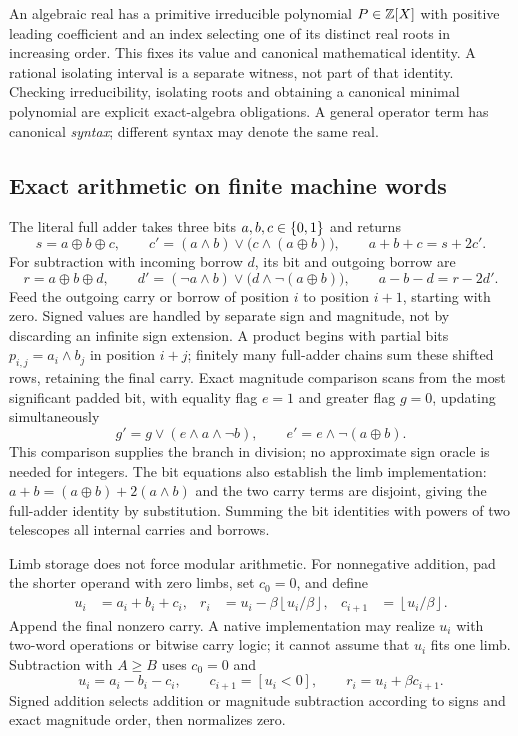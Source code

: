 An algebraic real has a primitive irreducible polynomial $P\in\mathbb Z[X]$ with
positive leading coefficient and an index selecting one of its distinct real
roots in increasing order. This fixes its value and canonical mathematical
identity. A rational isolating interval is a separate witness, not part of that
identity. Checking irreducibility, isolating roots and obtaining a canonical
minimal polynomial are explicit exact-algebra obligations. A general operator
term has canonical \emph{syntax}; different syntax may denote the same real.

\subsection{Exact arithmetic on finite machine words}
The literal full adder takes three bits $a,b,c\in\{0,1\}$ and returns
\[
 s=a\oplus b\oplus c,\qquad
 c'= (a\land b)\lor\bigl(c\land(a\oplus b)\bigr),
 \qquad a+b+c=s+2c'.
\]
For subtraction with incoming borrow $d$, its bit and outgoing borrow are
\[
 r=a\oplus b\oplus d,\qquad
 d'=(\neg a\land b)\lor\bigl(d\land\neg(a\oplus b)\bigr),
 \qquad a-b-d=r-2d'.
\]
Feed the outgoing carry or borrow of position $i$ to position $i+1$, starting
with zero. Signed values are handled by separate sign and magnitude, not by
discarding an infinite sign extension. A product begins with partial bits
$p_{i,j}=a_i\land b_j$ in position $i+j$; finitely many full-adder chains sum
these shifted rows, retaining the final carry. Exact magnitude comparison scans
from the most significant padded bit, with equality flag $e=1$ and greater flag
$g=0$, updating simultaneously
\[
 g'=g\lor(e\land a\land\neg b),\qquad
 e'=e\land\neg(a\oplus b).
\]
This comparison supplies the branch in division; no approximate sign oracle is
needed for integers. The bit equations also establish the limb implementation:
$a+b=(a\oplus b)+2(a\land b)$ and the two carry terms are disjoint, giving
the full-adder identity by substitution. Summing the bit identities with powers
of two telescopes all internal carries and borrows.

Limb storage does not force modular arithmetic. For nonnegative addition, pad
the shorter operand with zero limbs, set $c_0=0$, and define
\begin{align*}
 u_i&=a_i+b_i+c_i,&
 r_i&=u_i-\beta\left\lfloor u_i/\beta\right\rfloor,&
 c_{i+1}&=\left\lfloor u_i/\beta\right\rfloor.
\end{align*}
Append the final nonzero carry. A native implementation may realize $u_i$ with
two-word operations or bitwise carry logic; it cannot assume that $u_i$ fits one
limb. Subtraction with $A\ge B$ uses $c_0=0$ and
\[
 u_i=a_i-b_i-c_i,\qquad
 c_{i+1}=[u_i<0],\qquad r_i=u_i+\beta c_{i+1}.
\]
Signed addition selects addition or magnitude subtraction according to signs
and exact magnitude order, then normalizes zero.

